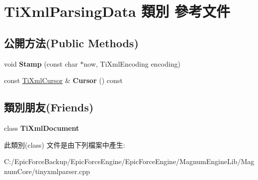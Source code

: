 \hypertarget{class_ti_xml_parsing_data}{}\section{Ti\+Xml\+Parsing\+Data 類別 參考文件}
\label{class_ti_xml_parsing_data}
\subsection*{公開方法(Public Methods)}
\begin{DoxyCompactItemize}
\item 
void {\bfseries Stamp} (const char $\ast$now, Ti\+Xml\+Encoding encoding)\hypertarget{class_ti_xml_parsing_data_a65cee8ab77a36c605db08c84b4c30a7d}{}\label{class_ti_xml_parsing_data_a65cee8ab77a36c605db08c84b4c30a7d}

\item 
const \hyperlink{struct_ti_xml_cursor}{Ti\+Xml\+Cursor} \& {\bfseries Cursor} () const \hypertarget{class_ti_xml_parsing_data_a9e63d965fdb53ff4ac711e105269e918}{}\label{class_ti_xml_parsing_data_a9e63d965fdb53ff4ac711e105269e918}

\end{DoxyCompactItemize}
\subsection*{類別朋友(Friends)}
\begin{DoxyCompactItemize}
\item 
class {\bfseries Ti\+Xml\+Document}\hypertarget{class_ti_xml_parsing_data_a173617f6dfe902cf484ce5552b950475}{}\label{class_ti_xml_parsing_data_a173617f6dfe902cf484ce5552b950475}

\end{DoxyCompactItemize}


此類別(class) 文件是由下列檔案中產生\+:\begin{DoxyCompactItemize}
\item 
C\+:/\+Epic\+Force\+Backup/\+Epic\+Force\+Engine/\+Epic\+Force\+Engine/\+Magnum\+Engine\+Lib/\+Magnum\+Core/tinyxmlparser.\+cpp\end{DoxyCompactItemize}
